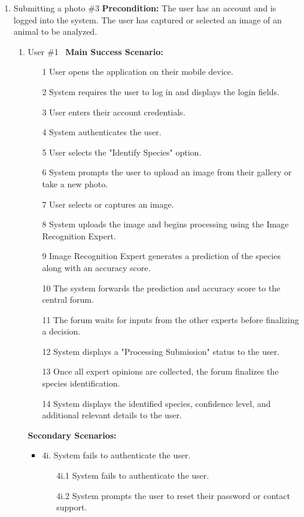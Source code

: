 \documentclass[]{article}
\begin{document}
\begin{enumerate}[{\bf BE1.}]
        \item Submitting a photo \#3
        \textbf{Precondition:} The user has an account and is logged into the system. The user has captured or selected an image of an animal to be analyzed.
        \begin{enumerate}[{\bf VP1.}]
        \item User \#1 \
        \textbf{Main Success Scenario:}
        \begin{enumerate}
        \item[1] User opens the application on their mobile device.
        \item[2] System requires the user to log in and displays the login fields.
        \item[3] User enters their account credentials.
        \item[4] System authenticates the user.
        \item[5] User selects the "Identify Species" option.
        \item[6] System prompts the user to upload an image from their gallery or take a new photo.
        \item[7] User selects or captures an image.
        \item[8] System uploads the image and begins processing using the Image Recognition Expert.
        \item[9] Image Recognition Expert generates a prediction of the species along with an accuracy score.
        \item[10] The system forwards the prediction and accuracy score to the central forum.
        \item[11] The forum waits for inputs from the other experts before finalizing a decision.
        \item[12] System displays a "Processing Submission" status to the user.
        \item[13] Once all expert opinions are collected, the forum finalizes the species identification.
        \item[14] System displays the identified species, confidence level, and additional relevant details to the user.
        \end{enumerate}

        \textbf{Secondary Scenarios:}
        \begin{itemize}
            \item 4i. System fails to authenticate the user.
            \begin{enumerate}
                \item[4i.1] System fails to authenticate the user.
                \item[4i.2] System prompts the user to reset their password or contact support.
            \end{enumerate}
            

\end{itemize}
\end{enumerate}
\end{enumerate}
\end{document}
